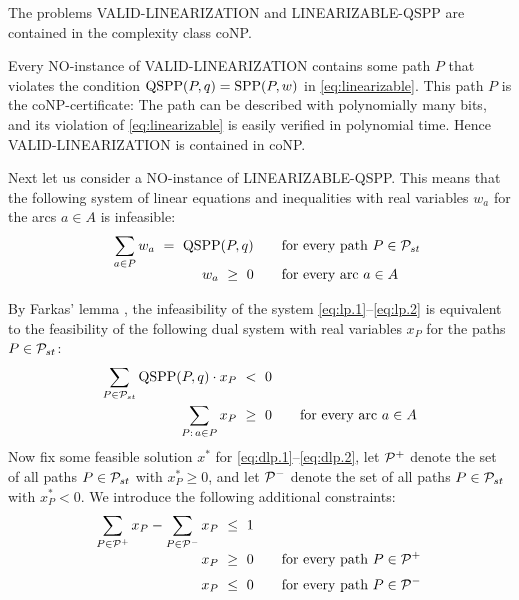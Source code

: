 \documentclass[11pt,fleqn]{article}
\begin{document}
\begin{lemma}
\label{le:coNP}
The problems VALID-LINEARIZATION and LINEARIZABLE-QSPP are contained in the complexity class coNP.
\end{lemma}
\proof
Every NO-instance of VALID-LINEARIZATION contains some path $P$ that violates the condition
$\text{QSPP}(P,q)=\text{SPP}(P,w)$ in \eqref{eq:linearizable}.
This path $P$ is the coNP-certificate: The path can be described with polynomially many bits,
and its violation of \eqref{eq:linearizable} is easily verified in polynomial time.
Hence VALID-LINEARIZATION is contained in coNP.

Next let us consider a NO-instance of LINEARIZABLE-QSPP.
This means that the following system of linear equations and inequalities with real 
variables $w_a$ for the arcs $a\in A$ is infeasible:
\begin{align}
\sum_{a\in P} w_a~=~\qspp(P,q) &\qquad\text{for every path $P\in\ppp$} \label{eq:lp.1} \\[-1.2ex]
              w_a~\ge~0        &\qquad\text{for every arc $a\in A$}    \label{eq:lp.2} \\[-2.5ex]
\hphantom{\sum_{P\in\ppp} \qspp(P,q)\cdot x_P~<~0} &&                  \nonumber
\end{align}
By Farkas' lemma \cite{Farkas1902}, the infeasibility of the system \eqref{eq:lp.1}--\eqref{eq:lp.2}
is equivalent to the feasibility of the following dual system with real variables $x_P$ for the
paths $P\in{\cal P}_{st}$:
\begin{align}
\sum_{P\in{\cal P}_{st}} \text{QSPP}(P,q)\cdot x_P ~<~0 &                                    \label{eq:dlp.1} \\[-0.2ex]
\sum_{P:\,a\in P} x_P             ~\ge~0 &\qquad\text{for every arc $a\in A$} \label{eq:dlp.2} 
\end{align}
Now fix some feasible solution $x^*$ for \eqref{eq:dlp.1}--\eqref{eq:dlp.2},
let ${\cal P}^+$ denote the set of all paths $P\in{\cal P}_{st}$ with $x^*_P\ge0$, and 
let ${\cal P}^-$ denote the set of all paths $P\in{\cal P}_{st}$ with $x^*_P<0$.
We introduce the following additional constraints:
\begin{align}
\sum_{P\in\pppx}x_P - \sum_{P\in\pppy}x_P  ~\le~1  &                 \label{eq:dlp.3} \\[-0.5ex]
                x_P  ~\ge~0 &\qquad\text{for every path $P\in\pppx$} \label{eq:dlp.4} \\[0.5ex]
                x_P  ~\le~0 &\qquad\text{for every path $P\in\pppy$} \label{eq:dlp.5} \\[-2.5ex] 
\hphantom{\sum_{P\in\ppp} \qspp(P,q)\cdot x_P~<~0} &&                \nonumber
\end{align}
\end{document}
